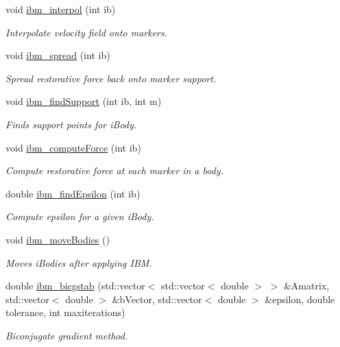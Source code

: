 \begin{DoxyCompactItemize}
void \hyperlink{class_object_manager_aff31915ad0effdcc8dc18f602ddd1c20}{ibm\+\_\+interpol} (int ib)
\begin{DoxyCompactList}\small\item\em Interpolate velocity field onto markers. \end{DoxyCompactList}\item 
void \hyperlink{class_object_manager_a8096f9ec97cf7ce2fc45ebfcbdf3617e}{ibm\+\_\+spread} (int ib)
\begin{DoxyCompactList}\small\item\em Spread restorative force back onto marker support. \end{DoxyCompactList}\item 
void \hyperlink{class_object_manager_ac5e71323491a8c3f38fecc51d1530a04}{ibm\+\_\+find\+Support} (int ib, int m)
\begin{DoxyCompactList}\small\item\em Finds support points for i\+Body. \end{DoxyCompactList}\item 
void \hyperlink{class_object_manager_ada21b4ed1a05af704597fce572142df8}{ibm\+\_\+compute\+Force} (int ib)
\begin{DoxyCompactList}\small\item\em Compute restorative force at each marker in a body. \end{DoxyCompactList}\item 
double \hyperlink{class_object_manager_a0538f952cf2d548ff89a3ce058fc1649}{ibm\+\_\+find\+Epsilon} (int ib)
\begin{DoxyCompactList}\small\item\em Compute epsilon for a given i\+Body. \end{DoxyCompactList}\item 
void \hyperlink{class_object_manager_ab93cad4c08e96444eec3278dff84665e}{ibm\+\_\+move\+Bodies} ()
\begin{DoxyCompactList}\small\item\em Moves i\+Bodies after applying I\+BM. \end{DoxyCompactList}\item 
double \hyperlink{class_object_manager_adad4317bfbe5bae833c4ffa3e4538d92}{ibm\+\_\+bicgstab} (std\+::vector$<$ std\+::vector$<$ double $>$ $>$ \&Amatrix, std\+::vector$<$ double $>$ \&b\+Vector, std\+::vector$<$ double $>$ \&epsilon, double tolerance, int maxiterations)
\begin{DoxyCompactList}\small\item\em Biconjugate gradient method. \end{DoxyCompactList}\item 

\end{DoxyCompactItemize}

